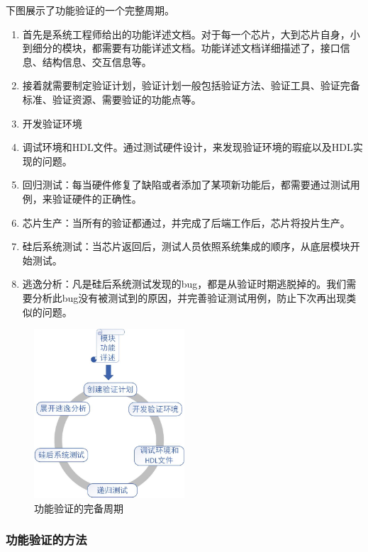 \begin{center}
下图展示了功能验证的一个完整周期。

\begin{enumerate}
	\item 首先是系统工程师给出的功能详述文档。对于每一个芯片，大到芯片自身，小到细分的模块，都需要有功能详述文档。功能详述文档详细描述了，接口信息、结构信息、交互信息等。
	\item 接着就需要制定验证计划，验证计划一般包括验证方法、验证工具、验证完备标准、验证资源、需要验证的功能点等。
	\item 开发验证环境
	\item 调试环境和HDL文件。通过测试硬件设计，来发现验证环境的瑕疵以及HDL实现的问题。
	\item 回归测试：每当硬件修复了缺陷或者添加了某项新功能后，都需要通过测试用例，来验证硬件的正确性。
	\item 芯片生产：当所有的验证都通过，并完成了后端工作后，芯片将投片生产。
	\item 硅后系统测试：当芯片返回后，测试人员依照系统集成的顺序，从底层模块开始测试。
	\item 逃逸分析：凡是硅后系统测试发现的bug，都是从验证时期逃脱掉的。我们需要分析此bug没有被测试到的原因，并完善验证测试用例，防止下次再出现类似的问题。
\end{enumerate}

\begin{figure}[H] %
\centering %
\includegraphics[width=0.5\textwidth]{Img/功能验证的完备周期.jpg} %
\caption{功能验证的完备周期} %
\label{功能验证的完备周期} %
\end{figure}

\subsubsection{功能验证的方法}


\end{center}
